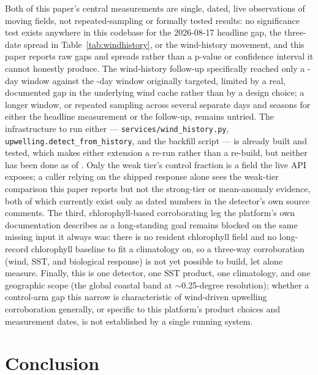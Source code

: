 Both of this paper's central measurements are single, dated, live
observations of moving fields, not repeated-sampling or formally tested
results: no significance test exists anywhere in this codebase for the
2026-08-17 headline gap, the three-date spread in
Table~\ref{tab:windhistory}, or the wind-history movement, and this paper
reports raw gaps and spreads rather than a p-value or confidence interval it
cannot honestly produce. The wind-history follow-up specifically reached
only a \WindHistoryActualWindowDays{}-day window against the
\WindHistoryTargetWindowDays{}-day window originally targeted, limited by a
real, documented gap in the underlying wind cache rather than by a design
choice; a longer window, or repeated sampling across several separate days
and seasons for either the headline measurement or the follow-up, remains
untried. The infrastructure to run either --- \texttt{services/wind\_history.py},
\texttt{upwelling.detect\_from\_history}, and the backfill script --- is
already built and tested, which makes either extension a re-run rather than
a re-build, but neither has been done as of \AsOf{}. Only the weak tier's
control fraction is a field the live API exposes; a caller relying on the
shipped response alone sees the weak-tier comparison this paper reports but
not the strong-tier or mean-anomaly evidence, both of which currently exist
only as dated numbers in the detector's own source comments. The third,
chlorophyll-based corroborating leg the platform's own documentation
describes as a long-standing goal remains blocked on the same missing input
it always was: there is no resident chlorophyll field and no long-record
chlorophyll baseline to fit a climatology on, so a three-way corroboration
(wind, SST, and biological response) is not yet possible to build, let alone
measure. Finally, this is one detector, one SST product, one climatology,
and one geographic scope (the global coastal band at $\sim$0.25-degree
resolution); whether a control-arm gap this narrow is characteristic of
wind-driven upwelling corroboration generally, or specific to this
platform's product choices and measurement dates, is not established by a
single running system.

\section{Conclusion}

